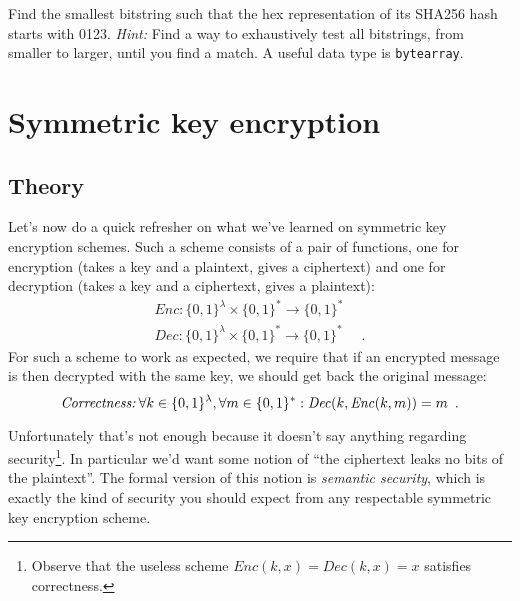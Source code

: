 \documentclass[a4paper,11pt]{article}
\begin{document}

    \begin{exercise*}
      \label{ex:hash:bruteforce}
      Find the smallest bitstring such that the hex representation of its SHA256
      hash starts with 0123. \emph{Hint:} Find a way to exhaustively test all
      bitstrings, from smaller to larger, until you find a match. A useful data
      type is \texttt{bytearray}.
    \end{exercise*}


  \section{Symmetric key encryption}
  \subsection{Theory}
    Let's now do a quick refresher on what we've learned on symmetric key
    encryption schemes. Such a scheme consists of a pair of functions, one for
    encryption (takes a key and a plaintext, gives a ciphertext) and one for
    decryption (takes a key and a ciphertext, gives a plaintext):
    \begin{align*}
      \mathit{Enc}: \{0, 1\}^{\lambda} \times \{0, 1\}^* \rightarrow \{0, 1\}^*
      & \\
      \mathit{Dec}: \{0, 1\}^{\lambda} \times \{0, 1\}^* \rightarrow \{0, 1\}^*
      & \enspace.
    \end{align*}
    For such a scheme to work as expected, we require that if an encrypted
    message is then decrypted with the same key, we should get back the original
    message:
    \begin{equation*}
      \emph{Correctness:} \: \forall k \in \{0, 1\}^{\lambda}, \forall m \in
      \{0, 1\}^*: \mathit{Dec}(k, \mathit{Enc}(k, m)) = m \enspace.
    \end{equation*}

    Unfortunately that's not enough because it doesn't say anything regarding
    security\footnote{Observe that the useless scheme $\mathit{Enc}(k, x) =
    \mathit{Dec}(k, x) = x$ satisfies correctness.}. In particular we'd want
    some notion of ``the ciphertext leaks no bits of the plaintext''. The formal
    version of this notion is \emph{semantic security}, which is exactly the
    kind of security you should expect from any respectable symmetric key
    encryption scheme.
\end{document}
